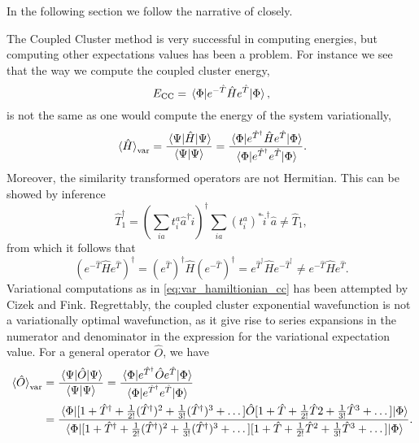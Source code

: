In the following section we follow the narrative of 
\citeauthor{kvaal2013variational}\cite{kvaal2013variational} closely.

The Coupled Cluster method is very successful in computing energies, but computing other 
expectations values has been a problem. For instance we see that the way we compute the
coupled cluster energy,
\begin{equation}
    E_{\text{CC}} = \mel{\Phi}{e^{-\hat{T}}\hat{H}e^{\hat{T}}}{\Phi},
\end{equation}
is not the same as one would compute the energy of the system variationally,
\begin{equation}
    \label{eq:var_hamiltionian_cc}
    \ev*{\hat{H}}_{\text{var}} = \frac{\mel{\Psi}{\hat{H}}{\Psi}}{\braket{\Psi}}
        = \frac{ \mel{\Phi}{e^{\hat{T}^\dagger} \hat{H} e^{\hat{T}}}{\Phi} }
            {\mel{\Phi}{e^{\hat{T}^\dagger} e^{\hat{T}}}{\Phi}}.
\end{equation}
Moreover, the similarity transformed operators are not Hermitian. This can be 
showed by inference
\begin{equation}
    \hat{T}^\dagger_1 = \left(\sum_{ia}t^a_i\hat{a}^\dagger \hat{i} \right)^\dagger 
        \sum_{ia} (t^a_i)^* \hat{i}^\dagger\hat{a} \neq \hat{T}_1,
\end{equation}
from which it follows that 
\begin{equation}
    \left(e^{-\hat{T}}\hat{H}e^{\hat{T}} \right)^\dagger
        = (e^{\hat{T}})^\dagger\hat{H}(e^{-\hat{T}})^\dagger
        = e^{\hat{T}^\dagger}\hat{H}e^{-\hat{T}^\dagger} 
        \neq e^{-\hat{T}}\hat{H}e^{\hat{T}}.
\end{equation}
Variational computations as in \autoref{eq:var_hamiltionian_cc} has been attempted 
by Cizek\cite{vcivzek1966correlation} and Fink\cite{fink1974new}.
Regrettably, the coupled cluster exponential 
wavefunction is not a variationally optimal wavefunction, as it give rise to
series expansions in the 
numerator and denominator in the expression for the variational expectation value. 
For a general operator $\hat{O}$, we have
\begin{equation}
    \begin{aligned}
        \label{eq:variational_exp_val_cc}
        \ev*{\hat{O}}_{\text{var}} &=\frac{ \mel{\Psi}{\hat{O}}{\Psi} }{\braket{\Psi}} 
            = \frac{ \mel{\Phi}{e^{\hat{T}^\dagger} \hat{O} e^{\hat{T}}}{\Phi} }
                {\mel{\Phi}{e^{\hat{T}^\dagger} e^{\hat{T}}}{\Phi}} \\
            &= \frac{
                \mel{\Phi}{
                [1 + \hat{T}^\dagger + \frac{1}{2!}(\hat{T}^\dagger)^2 + \frac{1}{3!}(\hat{T}^\dagger)^3 + \dots]
                \hat{O} 
                [1 + \hat{T}+ \frac{1}{2!}\hat{T}2 + \frac{1}{3!}\hat{T}^3 + \dots]
                }{\Phi}
                }{
                \mel
                {\Phi}
                {
                [1 + \hat{T}^\dagger + \frac{1}{2!}(\hat{T}^\dagger)^2 + \frac{1}{3!}(\hat{T}^\dagger)^3 + \dots]
                [1 + \hat{T} + \frac{1}{2!}\hat{T}^2 + \frac{1}{3!}\hat{T}^3 + \dots]
                } 
                {\Phi}
                }.
    \end{aligned}
\end{equation}
